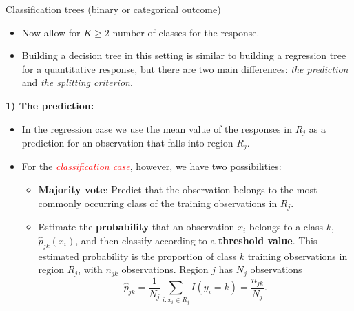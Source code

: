 \documentclass[10pt,ignorenonframetext,]{beamer}
\providecommand{\tightlist}{%
  \setlength{\itemsep}{0pt}\setlength{\parskip}{0pt}}
\begin{document}
\begin{frame}{Classification trees (binary or categorical outcome)}
\protect\hypertarget{classification-trees-binary-or-categorical-outcome}{}

\vspace{2mm}

\begin{itemize}
\tightlist
\item
  Now allow for \(K\geq 2\) number of classes for the response.
\end{itemize}

\vspace{1mm}

\begin{itemize}
\tightlist
\item
  Building a decision tree in this setting is similar to building a
  regression tree for a quantitative response, but there are two main
  differences: \emph{the prediction} and \emph{the splitting criterion}.
\end{itemize}

\end{frame}

\begin{frame}

\textbf{1) The prediction:}

\begin{itemize}
\item
  In the regression case we use the mean value of the responses in
  \(R_j\) as a prediction for an observation that falls into region
  \(R_j\). \vspace{2mm}
\item
  For the \emph{\textcolor{red}{classification case}}, however, we have
  two possibilities:

  \begin{itemize}
  \tightlist
  \item
    \textbf{Majority vote}: Predict that the observation belongs to the
    most commonly occurring class of the training observations in
    \(R_j\).\\
  \item
    Estimate the \textbf{probability} that an observation \(x_i\)
    belongs to a class \(k\), \(\hat{p}_{jk}(x_i)\), and then classify
    according to a \textbf{threshold value}. This estimated probability
    is the proportion of class \(k\) training observations in region
    \(R_j\), with \(n_{jk}\) observations. Region \(j\) has \(N_j\)
    observations
    \[\hat{p}_{jk} = \frac{1}{N_j} \sum_{i:x_i \in R_j} I(y_i = k)=\frac{n_{jk}}{N_j}.\]
  \end{itemize}
\end{itemize}

\end{frame}
\end{document}
